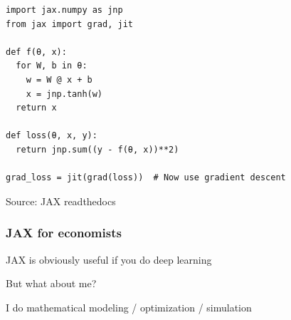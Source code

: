 \documentclass[
    xcolor={svgnames,dvipsnames},
    hyperref={colorlinks, citecolor=DeepPink4, linkcolor=DarkRed, urlcolor=DarkBlue}
    ]{beamer}  %
\newcommand{\1}{\mathbbm 1}
\begin{document}
\begin{frame}
    

    \begin{figure}
       \begin{center}
       \end{center}
    \end{figure}


\end{frame}


\begin{frame}[fragile]
    
    \vspace{-1em}
    \begin{verbatim}
import jax.numpy as jnp
from jax import grad, jit

def f(θ, x):
  for W, b in θ:
    w = W @ x + b
    x = jnp.tanh(w)  
  return x

def loss(θ, x, y):
  return jnp.sum((y - f(θ, x))**2)

grad_loss = jit(grad(loss))  # Now use gradient descent 
    \end{verbatim}

    {\footnotesize Source: JAX readthedocs}

\end{frame}



\begin{frame}
    \frametitle{JAX for economists}

    JAX is obviously useful if you do deep learning
    \vspace{0.5em}
    \vspace{0.5em}

    But what about me?

    \vspace{0.5em}
    \vspace{0.5em}
    \vspace{0.5em}
    I do mathematical modeling / optimization / simulation
    

\end{frame}
\end{document}
